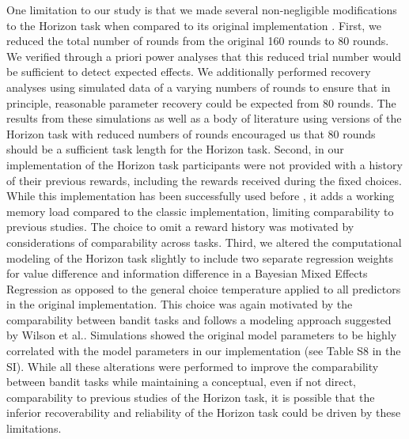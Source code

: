 \documentclass[fleqn,10pt]{wlscirep}
\begin{document}
One limitation to our study is that we made several non-negligible modifications to the Horizon task when compared to its original implementation \cite{wilson_humans_2014}. First, we reduced the total number of rounds from the original 160 rounds to 80 rounds. We verified through a priori power analyses that this reduced trial number would be sufficient to detect expected effects. We additionally performed recovery analyses using simulated data of a varying numbers of rounds to ensure that in principle, reasonable parameter recovery could be expected from 80 rounds. The results from these simulations as well as a body of literature using versions of the Horizon task with reduced numbers of rounds\cite{dubois_2022, dubois_human_2021, zaller_information_2021} encouraged us that 80 rounds should be a sufficient task length for the Horizon task. Second, in our implementation of the Horizon task participants were not provided with a history of their previous rewards, including the rewards received during the fixed choices. While this implementation has been successfully used before \cite{cogliati_dezza_should_2019}, it adds a working memory load compared to the classic implementation, limiting comparability to previous studies. The choice to omit a reward history was motivated by considerations of comparability across tasks. Third, we altered the computational modeling of the Horizon task slightly to include two separate regression weights for value difference and information difference in a Bayesian Mixed Effects Regression as opposed to the general choice temperature applied to all predictors in the original implementation\cite{wilson_humans_2014}. This choice was again motivated by the comparability between bandit tasks and follows a modeling approach suggested by Wilson et al.\cite{wilson_balancing_2021}. Simulations showed the original model parameters to be highly correlated with the model parameters in our implementation (see Table S8 in the SI). While all these alterations were performed to improve the comparability between bandit tasks while maintaining a conceptual, even if not direct, comparability to previous studies of the Horizon task, it is possible that the inferior recoverability and reliability of the Horizon task could be driven by these limitations.
\end{document}
